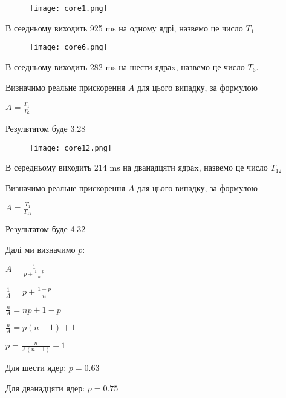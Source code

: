 \documentclass[12pt]{extarticle}
\begin{document}
\begin{figure}[H]
    \centering
    \texttt{[image: core1.png]}
    \caption{}
\end{figure}
В сеедньому виходить 925 ms на одному ядрі, назвемо це число $T_1$

\begin{figure}[H]
    \centering
    \texttt{[image: core6.png]}
    \caption{}
\end{figure}
В сеедньому виходить 282 ms на шести ядраx, назвемо це число $T_6$.

Визначимо реальне прискорення $A$ для цього випадку, за формулою 
\vspace{12pt}

$A = \frac{T_1}{T_6}$

Результатом буде 3.28


\begin{figure}[H]
    \centering
    \texttt{[image: core12.png]}
    \caption{}
\end{figure}
В середньому виходить 214 ms на дванадцяти ядраx, назвемо це число $T_{12}$

Визначимо реальне прискорення $A$ для цього випадку, за формулою 
\vspace{12pt}

$A = \frac{T_1}{T_{12}}$

Результатом буде 4.32
\vspace{12pt}

Далі ми визначимо $p$:

$A = \frac{1}{p + \frac{1-p}{n}}$

\vspace{12pt}

$\frac{1}{A} = p + \frac{1-p}{n}$

\vspace{12pt}

$\frac{n}{A} = np + 1 - p$

\vspace{12pt}

$\frac{n}{A} = p(n-1) + 1$

\vspace{12pt}

$p = \frac{n}{A(n-1)} - 1$

\vspace{12pt}

Для шести ядер: $p = 0.63$

Для дванадцяти ядер: $p = 0.75$

\vspace{12pt}
\end{document}
